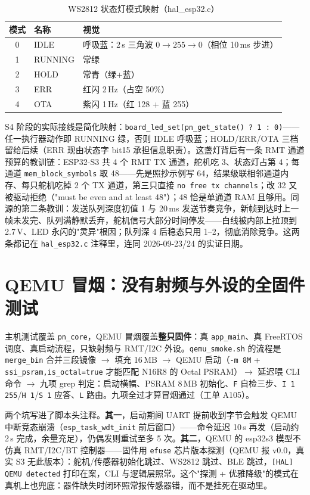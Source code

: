 \begin{table}[htbp]
  \centering
  \caption{WS2812 状态灯模式映射（hal\_esp32.c）}
  \label{tab:fw-led}
  \begin{tabular}{clp{6.2cm}}
    \toprule
    模式 & 名称 & 视觉 \\
    \midrule
    0 & IDLE & 呼吸蓝：2\,s 三角波 $0\to255\to0$（相位 10\,ms 步进） \\
    1 & RUNNING & 常绿 \\
    2 & HOLD & 常青（绿+蓝） \\
    3 & ERR & 红闪 2\,Hz（占空 50\%） \\
    4 & OTA & 紫闪 1\,Hz（红 128 + 蓝 255） \\
    \bottomrule
  \end{tabular}
\end{table}

S4 阶段的实际接线是简化映射：\texttt{board\_led\_set(pn\_get\_state() ? 1 : 0)}——任一执行器动作即 RUNNING 绿，否则 IDLE 呼吸蓝；HOLD/ERR/OTA 三档留给后续（ERR 现由状态字 bit15 承担信息职责）。这盏灯背后有一条 RMT 通道预算的教训链：ESP32-S3 共 4 个 RMT TX 通道，舵机吃 3、状态灯占第 4；每通道 \texttt{mem\_block\_symbols} 取 48——先是照抄示例写 64，结果级联相邻通道内存、每只舵机吃掉 2 个 TX 通道，第三只直接 \texttt{no free tx channels}；改 32 又被驱动拒绝（"must be even and at least 48"）；48 恰是单通道 RAM 且够用。同源的第二条教训：发送队列深度初值 1 与 20\,ms 发送节奏竞争，新帧到达时上一帧未发完、队列满静默丢弃，舵机信号大部分时间停发——白线被内部上拉顶到 2.7\,V、LED 永闪的"灵异"根因；队列深 4 后稳态只用 1--2，彻底消除竞争。这两条都记在 \texttt{hal\_esp32.c} 注释里，连同 2026-09-23/24 的实证日期。

\section{QEMU 冒烟：没有射频与外设的全固件测试}
\label{sec:fw-qemu}

主机测试覆盖 \texttt{pn\_core}，QEMU 冒烟覆盖\textbf{整只固件}：真 \texttt{app\_main}、真 FreeRTOS 调度、真启动流程，只缺射频与 RMT/I2C 外设。\texttt{qemu\_smoke.sh} 的流程是 \texttt{merge\_bin} 合并三段镜像 $\to$ 填充 16\,MB $\to$ QEMU 启动（\texttt{-m 8M} + \texttt{ssi\_psram,is\_octal=true} 才能匹配 N16R8 的 Octal PSRAM）$\to$ 延迟喂 CLI 命令 $\to$ 九项 grep 判定：启动横幅、PSRAM 8\,MB 初始化、\texttt{F} 自检三步、\texttt{I 1 255}/\texttt{H 1}/\texttt{S 1} 应答、\texttt{L} 路由。九项全过才算冒烟通过（工单 A105）。

两个坑写进了脚本头注释。\textbf{其一}，启动期间 UART 提前收到字节会触发 QEMU 中断竞态崩溃（\texttt{esp\_task\_wdt\_init} 前后窗口）——命令延迟 10\,s 再发（启动约 2\,s 完成，余量充足），仍偶发则重试至多 5 次。\textbf{其二}，QEMU 的 esp32s3 模型不仿真 RMT/I2C/BT 控制器——固件用 \texttt{efuse} 芯片版本探测（QEMU 报 v0.0，真实 S3 无此版本）：舵机/传感器初始化跳过、WS2812 跳过、BLE 跳过，\texttt{[HAL] QEMU detected} 打印在案，CLI 与逻辑层照常。这个"探测 + 优雅降级"的模式在真机上也兜底：器件缺失时闭环照常报传感器错，而不是挂死在驱动里。

